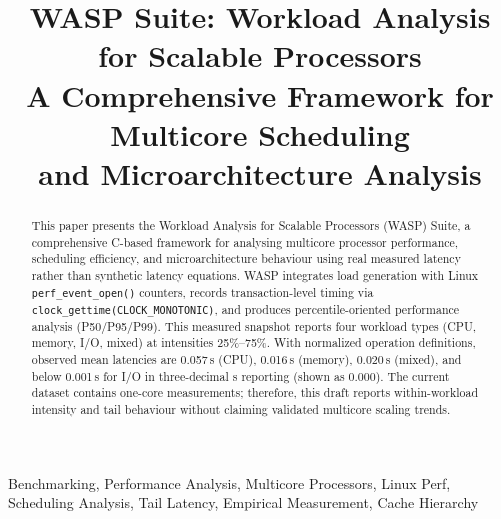 \documentclass[conference]{IEEEtran}
\begin{document}
\title{WASP Suite: Workload Analysis for Scalable Processors\\
A Comprehensive Framework for Multicore Scheduling\\
and Microarchitecture Analysis}

\author{
\and {}
}

\maketitle

\begin{abstract}
This paper presents the Workload Analysis for Scalable Processors (WASP)
Suite, a comprehensive C-based framework for analysing multicore processor
performance, scheduling efficiency, and microarchitecture behaviour using real
measured latency rather than synthetic latency equations.  WASP integrates
load generation with Linux \texttt{perf\_event\_open()} counters, records
transaction-level timing via \texttt{clock\_gettime(CLOCK\_MONOTONIC)}, and
produces percentile-oriented performance analysis (P50/P95/P99).
This measured snapshot reports four workload types (CPU, memory, I/O, mixed)
at intensities 25\%--75\%.  With normalized operation definitions, observed
mean latencies are 0.057\,\textmu{}s (CPU), 0.016\,\textmu{}s (memory),
0.020\,\textmu{}s (mixed), and below 0.001\,\textmu{}s for I/O in
three-decimal \textmu{}s reporting (shown as 0.000).  The current dataset
contains one-core measurements; therefore, this draft reports within-workload
intensity and tail behaviour without claiming validated multicore scaling
trends.
\end{abstract}

\begin{IEEEkeywords}
Benchmarking, Performance Analysis, Multicore Processors, Linux Perf,
Scheduling Analysis, Tail Latency, Empirical Measurement, Cache Hierarchy
\end{IEEEkeywords}
\end{document}
